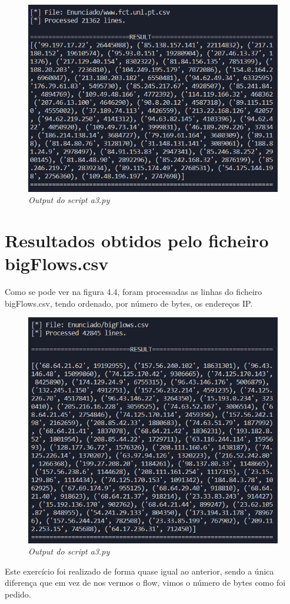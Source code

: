 \begin{figure}[h]
    \label{high}
    \centering
    \includegraphics[width=1\textwidth]{Images/a3/a3_a.png}
    \caption{\textit{Output do script a3.py}}
\end{figure}


\section{Resultados obtidos pelo ficheiro bigFlows.csv}

Como  se  pode  ver  na  figura  4.4,  foram  processadas  as  linhas do ficheiro bigFlows.csv, tendo ordenado, por número de bytes, os endereços IP.

\begin{figure}[h]
    \label{high}
    \centering
    \includegraphics[width=1\textwidth]{Images/a3/a3_b.png}
    \caption{\textit{Output do script a3.py}}
\end{figure}
\par
Este exercício foi realizado de forma quase igual ao anterior, sendo a única diferença que em vez de nos vermos o flow, vimos o número de bytes como foi pedido.
